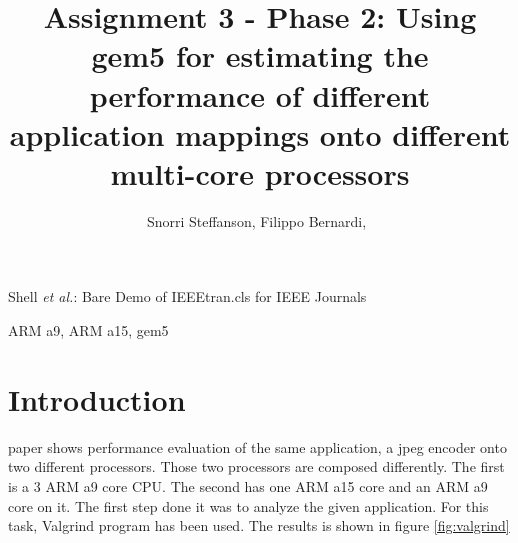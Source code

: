 \documentclass[journal]{IEEEtran}
\begin{document}
\title{Assignment 3 - Phase 2: Using gem5 for estimating the performance of different application mappings onto different multi-core processors
}

\author{Snorri Steffanson, Filippo Bernardi,~
}



%
{Shell \MakeLowercase{\textit{et al.}}: Bare Demo of IEEEtran.cls for IEEE Journals}


\maketitle

\begin{abstract}

\end{abstract}

\begin{IEEEkeywords}
ARM a9, ARM a15, gem5
\end{IEEEkeywords}




\IEEEpeerreviewmaketitle



\section{Introduction}

 paper shows performance evaluation of the same application, a jpeg encoder onto two different processors. Those two processors are composed differently. The first is a 3 ARM a9 core CPU. The second has one ARM a15 core and an ARM a9 core on it.
The first step done it was to analyze the given application. For this task, Valgrind program has been used.
The results is shown in figure \ref{fig:valgrind}
\end{document}
